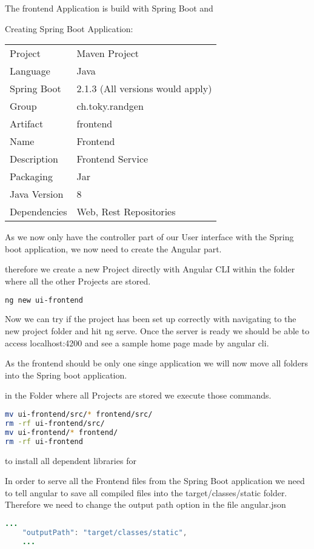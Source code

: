 The frontend Application is build with Spring Boot and 

Creating Spring Boot Application:
\begin{tabbing}
\begin{tabular}{ll}
Project & Maven Project \\
Language & Java \\
Spring Boot & 2.1.3 (All versions would apply) \\
Group & ch.toky.randgen \\
Artifact & frontend \\
Name & Frontend \\
Description & Frontend Service \\
Packaging & Jar \\
Java Version & 8 \\
Dependencies & Web, Rest Repositories
\end{tabular}
\end{tabbing}

As we now only have the controller part of our User interface with the Spring boot application, we now need to create the Angular part.

therefore we create a new Project directly with Angular CLI within the folder where all the other Projects are stored.

\begin{lstlisting}[language=Bash]
ng new ui-frontend
\end{lstlisting}

Now we can try if the project has been set up correctly with navigating to the new project folder and hit ng serve.
Once the server is ready we should be able to access localhost:4200 and see a sample home page made by angular cli.

As the frontend should be only one singe application we will now move all folders into the Spring boot application.

in the Folder where all Projects are stored we execute those commands.
\begin{lstlisting}[language=Bash]
mv ui-frontend/src/* frontend/src/
rm -rf ui-frontend/src/
mv ui-frontend/* frontend/
rm -rf ui-frontend
\end{lstlisting}



to install all dependent libraries for 

In order to serve all the Frontend files from the Spring Boot application we need to tell angular to save all compiled files into the target/classes/static folder.
Therefore we need to change the output path option in the file angular.json
\begin{lstlisting}[language=Java]
...
    "outputPath": "target/classes/static",
    ...
\end{lstlisting}

